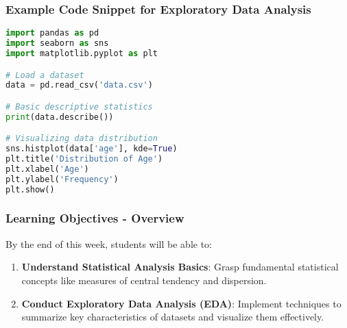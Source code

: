 \documentclass[aspectratio=169]{beamer}
\begin{document}
\begin{frame}[fragile]
    \frametitle{Example Code Snippet for Exploratory Data Analysis}
    \begin{lstlisting}[language=Python]
import pandas as pd
import seaborn as sns
import matplotlib.pyplot as plt

# Load a dataset
data = pd.read_csv('data.csv')

# Basic descriptive statistics
print(data.describe())

# Visualizing data distribution
sns.histplot(data['age'], kde=True)
plt.title('Distribution of Age')
plt.xlabel('Age')
plt.ylabel('Frequency')
plt.show()
    \end{lstlisting}
\end{frame}

\begin{frame}[fragile]
    \frametitle{Learning Objectives - Overview}
    By the end of this week, students will be able to:
    \begin{enumerate}
        \item \textbf{Understand Statistical Analysis Basics}: Grasp fundamental statistical concepts like measures of central tendency and dispersion.
        \item \textbf{Conduct Exploratory Data Analysis (EDA)}: Implement techniques to summarize key characteristics of datasets and visualize them effectively.
    \end{enumerate}
\end{frame}
\end{document}
